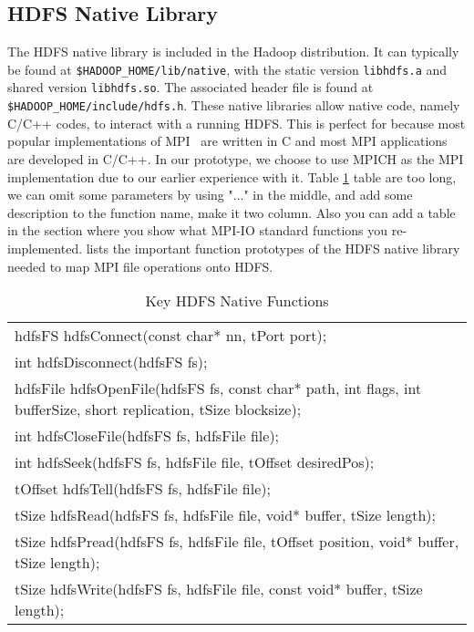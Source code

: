\subsection{HDFS Native Library}
The HDFS native library is included in the Hadoop distribution. It can typically
be found at \texttt{\$HADOOP\_HOME/lib/native}, with the static version
\texttt{libhdfs.a} and shared version \texttt{libhdfs.so}. The associated header
file is found at \texttt{\$HADOOP\_HOME/include/hdfs.h}. These native libraries
allow native code, namely C/C++ codes, to interact with a running HDFS. This is perfect for
{\proj} because most popular implementations of MPI~\cite{mpich, openmpi} are written in C and most
MPI applications are developed in C/C++. In our prototype, we choose to use
MPICH as the MPI implementation due to our earlier experience with it.
Table \ref{table:libhdfs} {\color{red} table are too long, we can omit some
parameters by using "..." in the middle, and add some description to the
function name, make it two column. Also you can add a table in the section where
you show what MPI-IO standard functions you re-implemented. }
lists the important function prototypes of the HDFS native library needed to map
MPI file operations onto HDFS.

\begin{table}[ht]
\caption{Key HDFS Native Functions}
{\ttfamily
\begin{tabular}{l}
\hline\hline
hdfsFS hdfsConnect(const char* nn, tPort port); \\
int hdfsDisconnect(hdfsFS fs); \\
hdfsFile hdfsOpenFile(hdfsFS fs, const char* path, int flags,
                          int bufferSize, short replication, tSize blocksize); \\
int hdfsCloseFile(hdfsFS fs, hdfsFile file); \\
int hdfsSeek(hdfsFS fs, hdfsFile file, tOffset desiredPos); \\
tOffset hdfsTell(hdfsFS fs, hdfsFile file); \\
tSize hdfsRead(hdfsFS fs, hdfsFile file, void* buffer, tSize length); \\
tSize hdfsPread(hdfsFS fs, hdfsFile file, tOffset position,
                    void* buffer, tSize length); \\
tSize hdfsWrite(hdfsFS fs, hdfsFile file, const void* buffer,
                    tSize length); \\
\hline\hline
\end{tabular}
}
\label{table:libhdfs}
\end{table}
					
